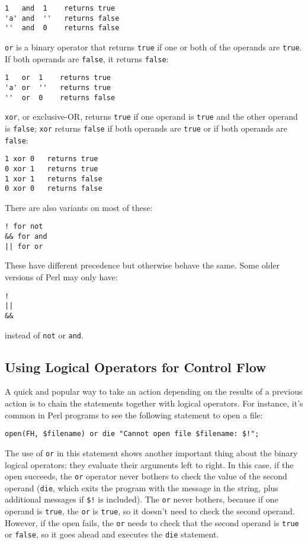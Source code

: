 \begin{lstlisting}
1   and  1    returns true
'a' and  ''   returns false
''  and  0    returns false
\end{lstlisting}

\verb|or| is a binary operator that returns \verb|true| if one or both of the operands are \verb|true|. If both operands are \verb|false|, it returns \verb|false|:

\begin{lstlisting}
1   or  1    returns true
'a' or  ''   returns true
''  or  0    returns false
\end{lstlisting}

\verb|xor|, or exclusive-OR, returns \verb|true| if one operand is \verb|true| and the other operand is \verb|false|; \verb|xor| returns \verb|false| if both operands are \verb|true| or if both operands are \verb|false|:

\begin{lstlisting}
1 xor 0   returns true
0 xor 1   returns true
1 xor 1   returns false
0 xor 0   returns false
\end{lstlisting}

There are also variants on most of these:

\begin{lstlisting}
! for not
&& for and
|| for or
\end{lstlisting}

These have different precedence but otherwise behave the same. Some older versions of Perl may only have:

\begin{lstlisting}
!
||
&&
\end{lstlisting}

instead of \verb|not| or \verb|and|.

\subsection{Using Logical Operators for Control Flow}
A quick and popular way to take an action depending on the results of a previous action is to chain the statements together with logical operators. For instance, it's common in Perl programs to see the following statement to open a file:

\begin{lstlisting}
open(FH, $filename) or die "Cannot open file $filename: $!";
\end{lstlisting}

The use of \verb|or| in this statement shows another important thing about the binary logical operators: they evaluate their arguments left to right. In this case, if the open succeeds, the \verb|or| operator never bothers to check the value of the second operand (\verb|die|, which exits the program with the message in the string, plus additional messages if \verb|$!| is included). The \verb|or| never bothers, because if one operand is \verb|true|, the \verb|or| is \verb|true|, so it doesn't need to check the second operand. However, if the open fails, the \verb|or| needs to check that the second operand is \verb|true| or \verb|false|, so it goes ahead and executes the \verb|die| statement.

